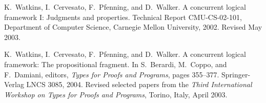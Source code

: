 \documentclass{sig-alt}
\begin{document}
\begin{thebibliography}{50}
K.~Watkins, I.~Cervesato, F.~Pfenning, and D.~Walker.
\newblock A concurrent logical framework {I}: Judgments and properties.
\newblock Technical Report CMU-CS-02-101, Department of Computer Science,
  Carnegie Mellon University, 2002.
\newblock Revised May 2003.

K.~Watkins, I.~Cervesato, F.~Pfenning, and D.~Walker.
\newblock A concurrent logical framework: The propositional fragment.
\newblock In S.~Berardi, M.~Coppo, and F.~Damiani, editors, {\em Types for
  Proofs and Programs}, pages 355--377. Springer-Verlag LNCS 3085, 2004.
\newblock Revised selected papers from the {\em Third International Workshop on
  Types for Proofs and Programs}, Torino, Italy, April 2003.

\end{thebibliography}
\end{document}
